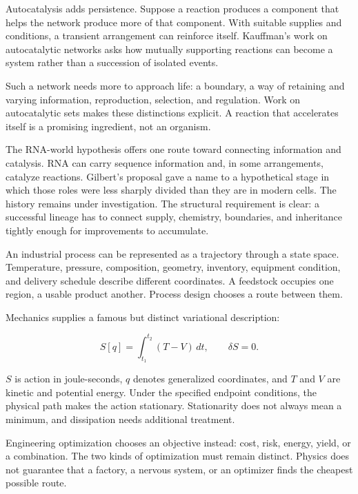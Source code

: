 
Autocatalysis adds persistence. Suppose a reaction produces a component that helps the network produce more of that component. With suitable supplies and conditions, a transient arrangement can reinforce itself. Kauffman's work on autocatalytic networks asks how mutually supporting reactions can become a system rather than a succession of isolated events.\cite{kauffman1993}

Such a network needs more to approach life: a boundary, a way of retaining and varying information, reproduction, selection, and regulation. Work on autocatalytic sets makes these distinctions explicit.\cite{hordijk2018} A reaction that accelerates itself is a promising ingredient, not an organism.

The RNA-world hypothesis offers one route toward connecting information and catalysis. RNA can carry sequence information and, in some arrangements, catalyze reactions. Gilbert's proposal gave a name to a hypothetical stage in which those roles were less sharply divided than they are in modern cells.\cite{gilbert1986} The history remains under investigation. The structural requirement is clear: a successful lineage has to connect supply, chemistry, boundaries, and inheritance tightly enough for improvements to accumulate.


An industrial process can be represented as a trajectory through a state space. Temperature, pressure, composition, geometry, inventory, equipment condition, and delivery schedule describe different coordinates. A feedstock occupies one region, a usable product another. Process design chooses a route between them.

Mechanics supplies a famous but distinct variational description:

\begin{equation}
S[q]=\int_{t_1}^{t_2}(T-V)\,dt,\qquad \delta S=0.
\end{equation}

$S$ is action in joule-seconds, $q$ denotes generalized coordinates, and $T$ and $V$ are kinetic and potential energy. Under the specified endpoint conditions, the physical path makes the action stationary. Stationarity does not always mean a minimum, and dissipation needs additional treatment.

Engineering optimization chooses an objective instead: cost, risk, energy, yield, or a combination. The two kinds of optimization must remain distinct. Physics does not guarantee that a factory, a nervous system, or an optimizer finds the cheapest possible route.

